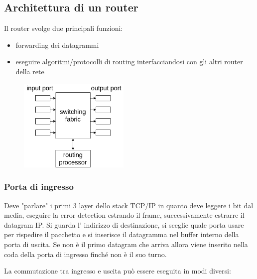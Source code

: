 \subsection{Architettura di un router}
Il router svolge due principali funzioni:
\begin{itemize}
    \item forwarding dei datagrammi
    \item eseguire algoritmi/protocolli di routing interfacciandosi con gli altri router della rete
\end{itemize}

\begin{figure}[H]
    \centering
    \includegraphics[width=200px]{images/5_Internetworking/router-architecture.png}
\end{figure}

\subsubsection{Porta di ingresso}
Deve "parlare" i primi 3 layer dello stack TCP/IP in quanto deve leggere i bit dal media, eseguire la error detection estrando il frame, successivamente estrarre il datagram IP.
Si guarda l' indirizzo di destinazione, si sceglie quale porta usare per rispedire il pacchetto e si inserisce il datagramma nel buffer interno della porta di uscita.
Se non è il primo datagram che arriva allora viene inserito nella coda della porta di ingresso finché non è il suo turno.

La commutazione tra ingresso e uscita può essere eseguita in modi diversi:

